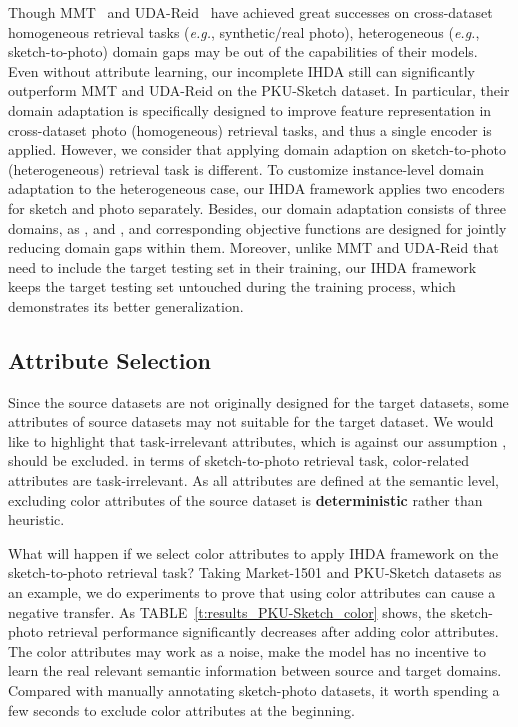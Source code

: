\documentclass[journal]{IEEEtran}
\begin{document}
Though MMT~\cite{ge2020mutual} and UDA-Reid~\cite{song2020unsupervised} have achieved great successes on cross-dataset homogeneous retrieval tasks (\textit{e.g.}, synthetic/real photo), heterogeneous (\textit{e.g.}, sketch-to-photo) domain gaps may be out of the capabilities of their models. Even without attribute learning, our incomplete IHDA still can significantly outperform MMT and UDA-Reid on the PKU-Sketch dataset. In particular, their domain adaptation is specifically designed to improve feature representation in cross-dataset photo (homogeneous) retrieval tasks, and thus a single encoder is applied. However, we consider that applying domain adaption on sketch-to-photo (heterogeneous) retrieval task is different. To customize instance-level domain adaptation to the heterogeneous case, our IHDA framework applies two encoders for sketch and photo separately. Besides, our domain adaptation consists of three domains, as ,  and , and corresponding objective functions are designed for jointly reducing domain gaps within them. Moreover, unlike MMT and UDA-Reid that need to include the target testing set in their training, our IHDA framework keeps the target testing set untouched during the training process, which demonstrates its better generalization.


\subsection{Attribute Selection}

Since the source datasets are not originally designed for the target datasets, some attributes of source datasets may not suitable for the target dataset. We would like to highlight that task-irrelevant attributes, which is against our assumption , should be excluded. in terms of sketch-to-photo retrieval task, color-related attributes are task-irrelevant. As all attributes are defined at the semantic level, excluding color attributes of the source dataset is \textbf{deterministic} rather than heuristic.

What will happen if we select color attributes to apply IHDA framework on the sketch-to-photo retrieval task? Taking Market-1501 and PKU-Sketch datasets as an example, we do experiments to prove that using color attributes can cause a negative transfer. As TABLE~\ref{t:results_PKU-Sketch_color} shows, the sketch-photo retrieval performance significantly decreases after adding color attributes. The color attributes may work as a noise, make the model has no incentive to learn the real relevant semantic information between source and target domains. Compared with manually annotating sketch-photo datasets, it worth spending a few seconds to exclude color attributes at the beginning.
\end{document}
